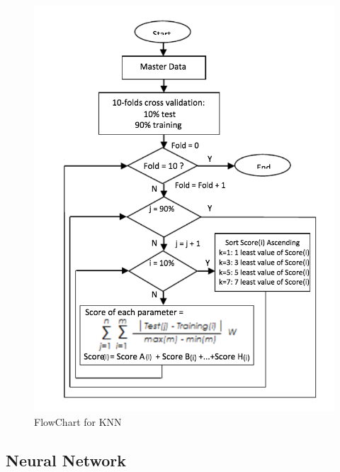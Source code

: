 \documentclass{book}
\begin{document}
    		\begin{figure}
    			\begin{center}
    				\includegraphics[width=15cm]{images/knn.png}
    				\caption{FlowChart for KNN}
    			\end{center}
    		\end{figure}
    
  		\subsection{Neural Network}
\end{document}
